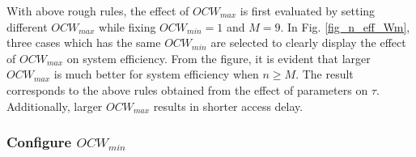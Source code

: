 \documentclass[journal]{IEEEtran}
\begin{document}
With above rough rules, the effect of $OCW_{max}$ is first evaluated by setting different $OCW_{max}$ while fixing $OCW_{min}=1$ and $M=9$.
In Fig. \ref{fig_n_eff_Wm}, three cases which has the same $OCW_{min}$ are selected to clearly display the effect of $OCW_{max}$ on system efficiency.
From the figure, it is evident that larger $OCW_{max}$ is much better for system efficiency when $n\geq M$. 
The result corresponds to the above rules obtained from the effect of parameters on $\tau$.
Additionally, larger $OCW_{max}$ results in shorter access delay. 


\subsubsection{Configure $OCW_{min}$}
\end{document}
